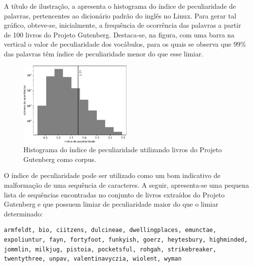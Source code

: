 \documentclass{textolivre}
\begin{document}
A título de ilustração, a  apresenta o histograma do índice de peculiaridade de palavras, 
pertencentes ao dicionário padrão do inglês no Linux. Para gerar tal gráfico, obteve-se, inicialmente, a frequência de ocorrência 
das palavras a partir de 100 livros do Projeto Gutenberg. Destaca-se, na figura, com uma barra na vertical o valor de peculiaridade 
dos vocábulos, para os quais se observa que 99\% das palavras têm índice de peculiaridade menor do que esse limiar.

\begin{figure}[h]
\centering
\includegraphics[width=0.5\textwidth]{peculiarity_histogram.pdf}
\caption{Histograma do índice de peculiaridade utilizando livros do Projeto Gutenberg como corpus.}
\label{fig-peculiarity_histogram}
\end{figure}

O índice de peculiaridade pode ser utilizado como um bom indicativo de malformação de uma sequência de caracteres. 
A seguir, apresenta-se uma pequena lista de sequências encontradas no conjunto de livros extraídos do Projeto Gutenberg
e que possuem limiar de peculiaridade maior do que o limiar determinado:

\begin{lstlisting}[label=lst-peculiarwords]
armfeldt, bio, ciitzens, dulcineae, dwellingplaces, emunctae, expoliuntur, fayn, fortyfoot, funkyish, goerz, heytesbury, highminded, jommlin, milkjug, pistoia, pocketsful, rohgah, strikebreaker, twentythree, unpav, valentinavyczia, wiolent, wyman
\end{lstlisting}



\end{document}
